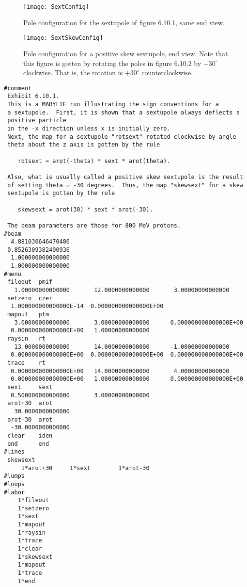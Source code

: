 \begin{figure}[hp]
  \centering
  \texttt{[image: SextConfig]}
  \caption{Pole configuration for the sextupole of figure 6.10.1, same end view.}
\end{figure}


\begin{figure}[hp]
  \centering
  \texttt{[image: SextSkewConfig]}
  \caption{Pole configuration for a positive skew sextupole, end view.
Note that this figure is gotten by rotating the poles in figure 6.10.2 by $-30^{\circ}$ clockwise.  That is, the rotation is $+30^\circ$ counterclockwise.}
\end{figure}

\clearpage
\begin{footnotesize}
\begin{verbatim}
#comment
 Exhibit 6.10.1.
 This is a MARYLIE run illustrating the sign conventions for a
 a sextupole.  First, it is shown that a sextupole always deflects a
 positive particle
 in the -x direction unless x is initially zero.
 Next, the map for a sextupole "rotsext" rotated clockwise by angle
 theta about the z axis is gotten by the rule

    rotsext = arot(-theta) * sext * arot(theta).

 Also, what is usually called a positive skew sextupole is the result
 of setting theta = -30 degrees.  Thus, the map "skewsext" for a skew
 sextupole is gotten by the rule

    skewsext = arot(30) * sext * arot(-30).

 The beam parameters are those for 800 MeV protons.
#beam
  4.881030646470486
 0.8526309382400936
  1.000000000000000
  1.000000000000000
#menu
 fileout  pmif
   1.00000000000000       12.0000000000000       3.00000000000000
 setzero  czer
  1.000000000000000E-14  0.000000000000000E+00
 mapout   ptm
   3.00000000000000       3.00000000000000      0.000000000000000E+00
  0.000000000000000E+00   1.00000000000000
 raysin   rt
   13.0000000000000       14.0000000000000      -1.00000000000000
  0.000000000000000E+00  0.000000000000000E+00  0.000000000000000E+00
 trace    rt
  0.000000000000000E+00   14.0000000000000       4.00000000000000
  0.000000000000000E+00   1.00000000000000      0.000000000000000E+00
 sext     sext
  0.500000000000000       3.00000000000000
 arot+30  arot
   30.0000000000000
 arot-30  arot
  -30.0000000000000
 clear    iden
 end      end
#lines
 skewsext
     1*arot+30     1*sext        1*arot-30
#lumps
#loops
#labor
    1*fileout
    1*setzero
    1*sext
    1*mapout
    1*raysin
    1*trace
    1*clear
    1*skewsext
    1*mapout
    1*trace
    1*end


\end{verbatim}
\end{footnotesize}
